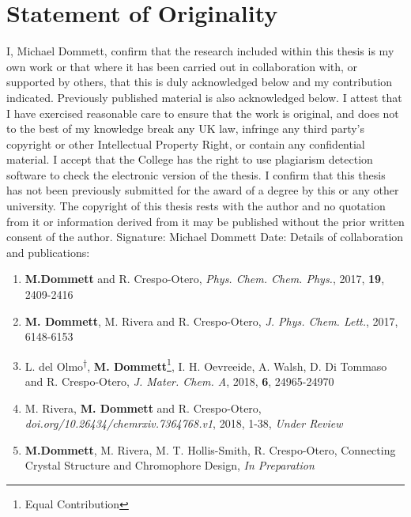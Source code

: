 \chapter*{Statement of Originality}
I, Michael Dommett, confirm that the research included within this thesis is my own work or that where it has been carried out in collaboration with, or supported by others, that this is duly acknowledged below and my contribution indicated. Previously published material is also acknowledged below.
I attest that I have exercised reasonable care to ensure that the work is original, and does not to the best of my knowledge break any UK law, infringe any third party's copyright or other Intellectual Property Right, or contain any confidential material.
I accept that the College has the right to use plagiarism detection software to check the electronic version of the thesis.
I confirm that this thesis has not been previously submitted for the award of a degree by this or any other university.
The copyright of this thesis rests with the author and no quotation from it or information derived from it may be published without the prior written consent of the author.
\newline
\newline
Signature: Michael Dommett 
Date:
\newline
\newline
Details of collaboration and publications:
\begin{enumerate}
    \item \textbf{M.Dommett} and R. Crespo-Otero, \textit{Phys. Chem. Chem. Phys.}, 2017, \textbf{19}, 2409-2416
    \item \textbf{M. Dommett}, M. Rivera and R. Crespo-Otero, \textit{J. Phys. Chem. Lett.}, 2017, 6148-6153
    \item L. del Olmo\textsuperscript{$\dag$}, \textbf{M. Dommett}\footnote[2]{Equal Contribution}, I. H. Oevreeide, A. Walsh, D. Di Tommaso and R. Crespo-Otero, \textit{J. Mater. Chem. A}, 2018, \textbf{6}, 24965-24970
     \item M. Rivera, \textbf{M. Dommett}  and R. Crespo-Otero, \textit{doi.org/10.26434/chemrxiv.7364768.v1}, 2018, 1-38, \textit{Under Review}
     
    \item \textbf{M.Dommett}, M. Rivera, M. T. Hollis-Smith, R. Crespo-Otero, Connecting Crystal Structure and Chromophore Design, \textit{In Preparation}
\end{enumerate}